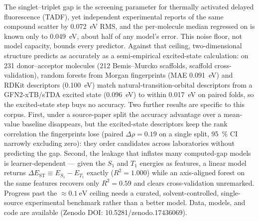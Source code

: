 
The singlet--triplet gap \deltaest is the screening parameter for thermally activated
delayed fluorescence (TADF), yet independent experimental reports of the same
compound scatter by \qty{0.072}{\electronvolt} RMS, and the per-molecule median
regressed on is known only to \qty{0.049}{\electronvolt}, about half of any model's
error. This noise floor, not model capacity, bounds every predictor.
%
Against that ceiling, two-dimensional structure predicts as accurately as a
semi-empirical excited-state calculation: on \num{231} donor--acceptor molecules
(\num{212} Bemis--Murcko scaffolds, scaffold cross-validation), random forests from
Morgan fingerprints (MAE \qty{0.091}{\electronvolt}) and RDKit descriptors
(\qty{0.100}{\electronvolt}) match natural-transition-orbital descriptors from a
GFN2-xTB/sTDA excited state (\qty{0.096}{\electronvolt}) to within
\qty{0.017}{\electronvolt} on paired folds, so the excited-state step buys no
accuracy.
%
Two further results are specific to this corpus. First, under a source-paper split the
accuracy advantage over a mean-value baseline disappears, but the excited-state
descriptors keep the rank correlation the fingerprints lose (paired
$\Delta\rho = \num{0.19}$ on a single split, \qty{95}{\percent} CI narrowly excluding
zero): they order candidates across laboratories without predicting the gap. Second,
the leakage that inflates many computed-gap models is learner-dependent --- given the
$S_1$ and $T_1$ energies as features, a linear model returns
$\Delta E_\text{ST}\equiv E_{S_1}-E_{T_1}$ exactly ($R^2 = 1.000$) while an
axis-aligned forest on the same features recovers only $R^2 = 0.59$ and clears
cross-validation unremarked.
%
Progress past the $\approx\qty{0.1}{\electronvolt}$ ceiling needs a curated,
solvent-controlled, single-source experimental benchmark rather than a better model.
%
Data, models, and code are available (Zenodo DOI: 10.5281/zenodo.17436069).
